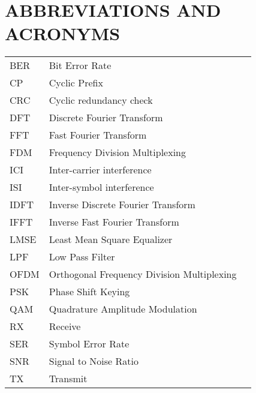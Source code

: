 \section*{ABBREVIATIONS AND ACRONYMS}
 {}

\begin{tabularx}{0.9\textwidth}{ L{0.4} L{1.3} L{1.3} }
    BER     & Bit Error Rate \\ %
    CP      & Cyclic Prefix \\
    CRC     & Cyclic redundancy check \\
    DFT     & Discrete Fourier Transform \\
    FFT     & Fast Fourier Transform \\
    FDM     & Frequency Division Multiplexing \\
    ICI     & Inter-carrier interference \\
    ISI     & Inter-symbol interference \\
    IDFT    & Inverse Discrete Fourier Transform \\
    IFFT    & Inverse Fast Fourier Transform \\
    LMSE    & Least Mean Square Equalizer \\ %
    LPF     & Low Pass Filter \\
    OFDM    & Orthogonal Frequency Division Multiplexing \\ %
    PSK     & Phase Shift Keying \\ %
    QAM     & Quadrature Amplitude Modulation \\ %
    RX      & Receive \\
    SER     & Symbol Error Rate \\ %
    SNR     & Signal to Noise Ratio \\ %
    TX      & Transmit \\
\end{tabularx}

\newpage